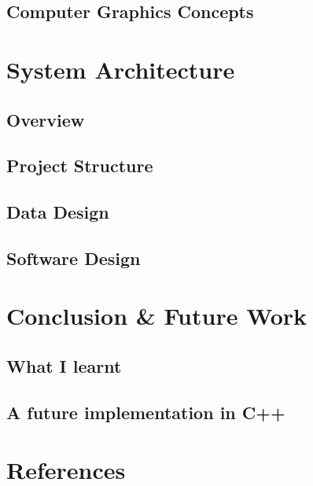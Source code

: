 \documentclass{article}
\begin{document}
\subsection{Computer Graphics Concepts}

\section{System Architecture}
\subsection{Overview}
\subsection{Project Structure}
\subsection{Data Design}
\subsection{Software Design}

\section{Conclusion \& Future Work}
\subsection{What I learnt}
\subsection{A future implementation in C++}

\section{References}
\end{document}
